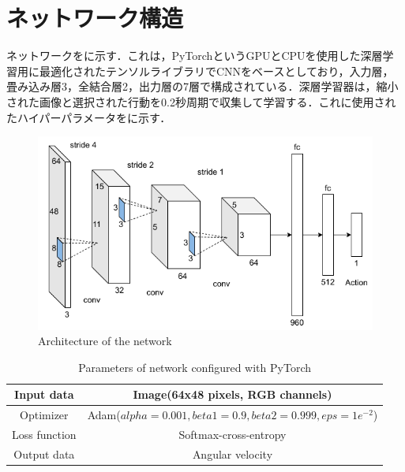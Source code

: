 
\section{ネットワーク構造}

  ネットワークをに示す．これは，PyTorch\cite{pytorch}というGPUとCPUを使用した深層学習用に最適化されたテンソルライブラリでCNNをベースとしており，入力層，畳み込み層3，全結合層2，出力層の7層で構成されている．深層学習器は，縮小された画像と選択された行動を0.2秒周期で収集して学習する．これに使用されたハイパーパラメータをに示す．

  \begin{figure}[h]
    \centering
    \includegraphics[keepaspectratio, scale=0.60] {images/RobotGuidance_network.png}
    \caption{Architecture of the network}
    \label{Fig:RobotGuidance_network}
  \end{figure}

  \begin{table}[hbtp]
    \caption{Parameters of network configured with PyTorch}
    \label{tab:Parameters of network configured with pytorch}
    \centering
    \begin{tabular}{|c|c|}
      \hline
      Input data & Image(64x48 pixels, RGB channels) \\
      \hline
      Optimizer & Adam($alpha = 0.001, beta1 = 0.9, beta2 =  0.999, eps = 1e^{-2}$)\\
      \hline
      Loss function & Softmax-cross-entropy\\
      \hline
      Output data & Angular velocity\\
      \hline
    \end{tabular}
  \end{table}

\newpage

